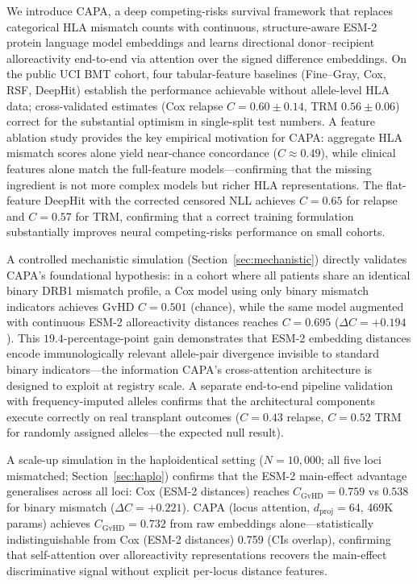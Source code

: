 \documentclass[11pt,a4paper]{article}
\begin{document}
We introduce CAPA, a deep competing-risks survival framework that replaces
categorical HLA mismatch counts with continuous, structure-aware ESM-2 protein
language model embeddings and learns directional donor--recipient
alloreactivity end-to-end via attention over the signed difference embeddings.  On the public UCI BMT cohort, four tabular-feature
baselines (Fine--Gray, Cox, RSF, DeepHit) establish the performance achievable
without allele-level HLA data; cross-validated estimates (Cox relapse
$C=0.60 \pm 0.14$, TRM $0.56 \pm 0.06$) correct for the substantial optimism
in single-split test numbers.  A feature ablation study provides the key
empirical motivation for CAPA: aggregate HLA mismatch scores alone yield
near-chance concordance ($C \approx 0.49$), while clinical features alone
match the full-feature models---confirming that the missing ingredient is not
more complex models but richer HLA representations.  The flat-feature DeepHit
with the corrected censored NLL achieves $C=0.65$ for relapse and $C=0.57$ for
TRM, confirming that a correct training formulation substantially improves
neural competing-risks performance on small cohorts.

A controlled mechanistic simulation (Section~\ref{sec:mechanistic}) directly
validates CAPA's foundational hypothesis: in a cohort where all patients share
an identical binary DRB1 mismatch profile, a Cox model using only binary mismatch
indicators achieves GvHD $C = 0.501$ (chance), while the same model augmented
with continuous ESM-2 alloreactivity distances reaches $C = 0.695$
($\Delta C = +0.194$).  This $19.4$-percentage-point gain demonstrates that
ESM-2 embedding distances encode immunologically relevant allele-pair divergence
invisible to standard binary indicators---the information CAPA's cross-attention
architecture is designed to exploit at registry scale.  A separate end-to-end
pipeline validation with frequency-imputed alleles confirms that the
architectural components execute correctly on real transplant outcomes
($C=0.43$ relapse, $C=0.52$ TRM for randomly assigned alleles---the expected
null result).

A scale-up simulation in the haploidentical setting ($N=10{,}000$; all five
loci mismatched; Section~\ref{sec:haplo}) confirms that the ESM-2 main-effect
advantage generalises across all loci: Cox (ESM-2 distances) reaches
$C_{\mathrm{GvHD}} = 0.759$ vs $0.538$ for binary mismatch ($\Delta C = +0.221$).
CAPA (locus attention, $d_{\mathrm{proj}}=64$, 469K params) achieves
$C_{\mathrm{GvHD}}=0.732$ from raw embeddings alone---statistically
indistinguishable from Cox (ESM-2 distances) 0.759 (CIs overlap), confirming
that self-attention over alloreactivity representations recovers the main-effect
discriminative signal without explicit per-locus distance features.
\end{document}
